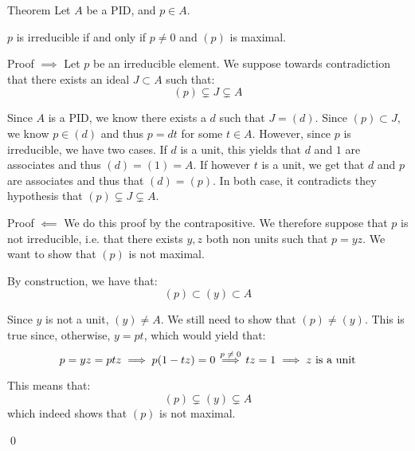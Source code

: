 \documentclass[a4paper]{article}
\begin{document}
\begin{parag}{Theorem}
    Let $A$ be a PID, and $p \in A$.

    $p$ is irreducible if and only if $p \neq 0$ and $\left(p\right)$ is maximal.

    \begin{subparag}{Proof $\implies$}
        Let $p$ be an irreducible element. We suppose towards contradiction that there exists an ideal $J \subset A$ such that: 
        \[\left(p\right) \subsetneq J \subsetneq A\]

        Since $A$ is a PID, we know there exists a $d$ such that $J = \left(d\right)$. Since $\left(p\right) \subset J$, we know $p \in \left(d\right)$ and thus $p = dt$ for some $t \in A$. However, since $p$ is irreducible, we have two cases. If $d$ is a unit, this yields that $d$ and $1$ are associates and thus $\left(d\right) = \left(1\right) = A$. If however $t$ is a unit, we get that $d$ and $p$ are associates and thus that $\left(d\right) = \left(p\right)$. In both case, it contradicts they hypothesis that $\left(p\right) \subsetneq J \subsetneq A$.
    \end{subparag}

    \begin{subparag}{Proof $\impliedby$}
        We do this proof by the contrapositive. We therefore suppose that $p$ is not irreducible, i.e. that there exists $y, z$ both non units such that $p = yz$. We want to show that $\left(p\right)$ is not maximal.

        By construction, we have that: 
        \[\left(p\right) \subset \left(y\right) \subset A\]

        Since $y$ is not a unit, $\left(y\right) \neq A$. We still need to show that  $\left(p\right) \neq \left(y\right)$. This is true since, otherwise, $y = pt$, which would yield that: 
        \[p = yz = ptz \implies p\left(1 - tz\right) = 0 \over{\implies}{$p \neq 0$} tz = 1 \implies z \text{ is a unit}\]

        This means that: 
        \[\left(p\right) \subsetneq \left(y\right) \subsetneq A\]
        which indeed shows that $\left(p\right)$ is not maximal. 

        \qed
    \end{subparag}
\end{parag}
\end{document}
